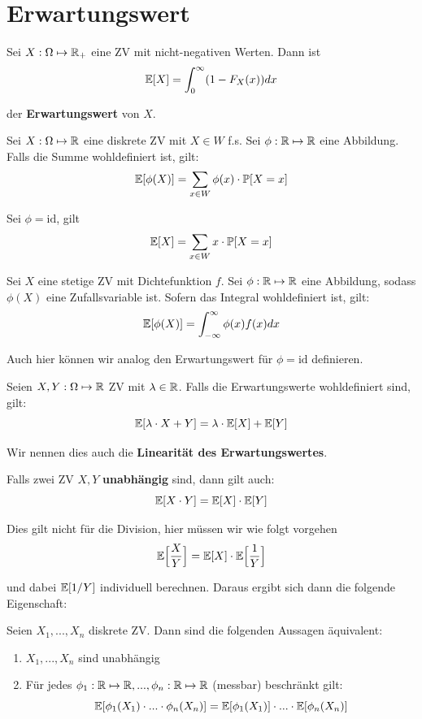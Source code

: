 \section{Erwartungswert}


Sei $X: \Omega \mapsto \mathbb{R}_+$ eine ZV mit nicht-negativen Werten. Dann ist 
$$\mathbb{E}[X] = \int_0^\infty (1 - F_X(x))dx$$
    
der \textbf{Erwartungswert} von $X$.



Sei $X: \Omega \mapsto \mathbb{R}$ eine diskrete ZV mit $X \in W$ f.s. Sei $\phi: \mathbb{R} \mapsto \mathbb{R}$ eine Abbildung. Falls die Summe wohldefiniert ist, gilt:
$$\mathbb{E}[\phi(X)] = \sum_{x \in W} \phi(x) \cdot \mathbb{P}[X = x]$$

Sei $\phi = \text{id}$, gilt 
$$\mathbb{E}[X] = \sum_{x \in W} x \cdot \mathbb{P}[X = x]$$



Sei $X$ eine stetige ZV mit Dichtefunktion $f$. Sei $\phi: \mathbb{R} \mapsto \mathbb{R}$ eine Abbildung, sodass $\phi(X)$ eine Zufallsvariable ist. Sofern das Integral wohldefiniert ist, gilt:
$$\mathbb{E}[\phi(X)] = \int_{-\infty}^\infty \phi(x)f(x)dx$$

 Auch hier können wir analog den Erwartungswert für $\phi = \text{id}$ definieren.

\columnbreak


\begin{tcolorbox}
    Seien $X,Y: \Omega \mapsto \mathbb{R}$ ZV mit $\lambda \in \mathbb{R}$. Falls die Erwartungswerte wohldefiniert sind, gilt:    
    $$\mathbb{E}[\lambda \cdot X + Y] = \lambda \cdot \mathbb{E}[X] + \mathbb{E}[Y]$$
    
    Wir nennen dies auch die \textbf{Linearität des Erwartungswertes}.
\end{tcolorbox}

Falls zwei ZV $X,Y$ \textbf{unabhängig} sind, dann gilt auch:
$$\mathbb{E}[X \cdot Y] = \mathbb{E}[X] \cdot \mathbb{E}[Y]$$

Dies gilt nicht für die Division, hier müssen wir wie folgt vorgehen
$$\mathbb{E} \Big[ \frac{X}{Y} \Big] = \mathbb{E}[X] \cdot \mathbb{E} \Big[ \frac{1}{Y} \Big]$$

und dabei $\mathbb{E} [1 / Y]$ individuell berechnen. Daraus ergibt sich dann die folgende Eigenschaft:

\begin{tcolorbox}
    Seien $X_1,...,X_n$ diskrete ZV. Dann sind die folgenden Aussagen äquivalent:
    \begin{enumerate}
        \item $X_1,...,X_n$ sind unabhängig
        \item Für jedes $\phi_1: \mathbb{R} \mapsto \mathbb{R},..., \phi_n: \mathbb{R} \mapsto \mathbb{R}$ (messbar) beschränkt gilt:
        $$\mathbb{E}[\phi_1(X_1) \cdot ... \cdot \phi_n(X_n)] = \mathbb{E}[\phi_1(X_1)] \cdot ... \cdot \mathbb{E}[\phi_n(X_n)]$$
    \end{enumerate}
\end{tcolorbox}



